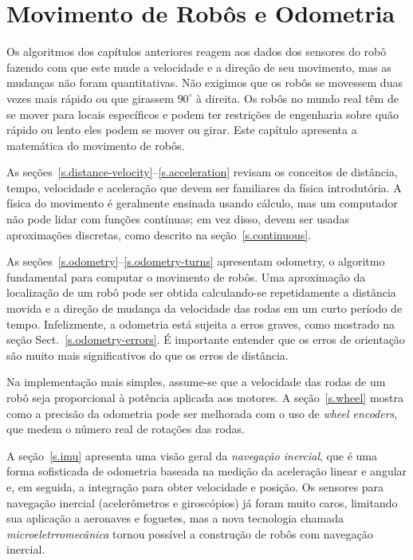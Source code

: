 
\chapter{Movimento de Robôs e Odometria}\label{ch.motion}

Os algoritmos dos capítulos anteriores reagem aos dados dos sensores do robô fazendo com que este mude a velocidade e a direção de seu movimento, mas as mudanças não foram quantitativas. Não exigimos que os robôs se movessem duas vezes mais rápido ou que girassem $90^\circ$ à direita. Os robôs no mundo real têm de se mover para locais específicos e podem ter restrições de engenharia sobre quão rápido ou lento eles podem se mover ou girar. Este capítulo apresenta a matemática do movimento de robôs.

As seções~\ref{s.distance-velocity}--\ref{s.acceleration} revisam os conceitos de distância, tempo, velocidade e aceleração que devem ser familiares da física introdutória. A física do movimento é geralmente ensinada usando cálculo, mas um computador não pode lidar com funções contínuas; em vez disso, devem ser usadas aproximações discretas, como descrito na seção~\ref{s.continuous}.

As seções~\ref{s.odometry}--\ref{s.odometry-turns} apresentam {odometry}, o algoritmo fundamental para computar o movimento de robôs. Uma aproximação da localização de um robô pode ser obtida calculando-se repetidamente a distância movida e a direção de mudança da velocidade das rodas em um curto período de tempo. Infelizmente, a odometria está sujeita a erros graves, como mostrado na seção Sect.~\ref{s.odometry-errors}. É importante entender que os erros de orientação são muito mais significativos do que os erros de distância.

Na implementação mais simples, assume-se que a velocidade das rodas de um robô seja proporcional à potência aplicada aos motores. A seção~\ref{s.wheel} mostra como a precisão da odometria pode ser melhorada com o uso de \emph{wheel encoders}, que medem o número real de rotações das rodas.

A seção~\ref{s.imu} apresenta uma visão geral da \emph{navegação inercial}, que é uma forma sofisticada de odometria baseada na medição da aceleração linear e angular e, em seguida, a integração para obter velocidade e posição. Os sensores para navegação inercial (acelerômetros e giroscópios) já foram muito caros, limitando sua aplicação a aeronaves e foguetes, mas a nova tecnologia chamada \emph{microeletrromecânica} tornou possível a construção de robôs com navegação inercial.


